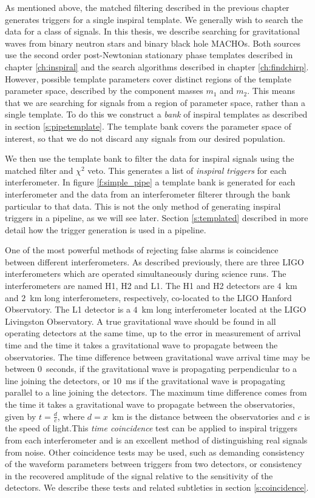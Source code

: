 As mentioned above, the matched filtering described in the previous chapter
generates triggers for a single inspiral template. We generally wish to search
the data for a class of signals. In this thesis, we describe searching for
gravitational waves from binary neutron stars and binary black hole MACHOs.
Both sources use the second order post-Newtonian stationary phase templates
described in chapter \ref{ch:inspiral} and the search algorithms described in
chapter \ref{ch:findchirp}. However, possible template parameters cover
distinct regions of the template parameter space, described by the component
masses $m_1$ and $m_2$. This means that we are searching for signals from a 
region of parameter space, rather than a single template. To do this we
construct a \emph{bank} of inspiral templates as described in section
\ref{s:pipetemplate}. The template bank covers the parameter space of interest, so
that we do not discard any signals from our desired population.

We then use the template bank to filter the data for inspiral signals using
the matched filter and $\chi^2$ veto. This generates a list of \emph{inspiral
triggers} for each interferometer. In figure \ref{f:simple_pipe} a template
bank is generated for each interferometer and the data from an interferometer
filterer through the bank particular to that data. This is not the only method
of generating inspiral triggers in a pipeline, as we will see later. Section
\ref{s:templated} described in more detail how the trigger generation is used
in a pipeline.

One of the most powerful methods of rejecting false alarms is coincidence
between different interferometers. As described previously, there are three
LIGO interferometers which are operated simultaneously during science runs.
The interferometers are named H1, H2 and L1. The H1 and H2 detectors are
$4$~km and $2$~km long interferometers, respectively, co-located to the LIGO
Hanford Observatory. The L1 detector is a $4$~km long interferometer located
at the LIGO Livingston Observatory. A true gravitational wave should be found
in all operating detectors at the same time, up to the error in measurement of
arrival time and the time it takes a gravitational wave to propagate between
the observatories. The time difference between gravitational wave arrival time
may be between $0$~seconds, if the gravitational wave is propagating
perpendicular to a line joining the detectors, or $10$~ms if the gravitational
wave is propagating parallel to a line joining the detectors. The maximum
time difference comes from the time it takes a gravitational wave to propagate
between the observatories, given by $t = \frac{d}{c}$, where $d = x$~km is the
distance between the observatories and $c$ is the speed of light.This
\emph{time coincidence} test can be applied to inspiral triggers from each
interferometer and is an excellent method of distinguishing real signals from
noise. Other coincidence tests may be used, such as demanding consistency of
the waveform parameters between triggers from two detectors, or consistency in
the recovered amplitude of the signal relative to the sensitivity of the
detectors. We describe these tests and related subtleties in section
\ref{s:coincidence}.

